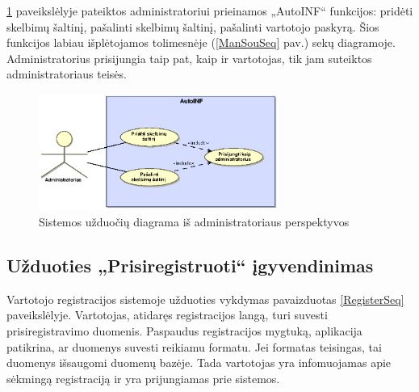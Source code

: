 \documentclass[12pt]{article}
\begin{document}
	\pagebreak	
	
	\ref{UseCaseAdmin} paveikslėlyje pateiktos administratoriui prieinamos „AutoINF“ funkcijos: pridėti skelbimų šaltinį, pašalinti skelbimų šaltinį, pašalinti vartotojo paskyrą. Šios funkcijos labiau išplėtojamos tolimesnėje (\ref{ManSouSeq} pav.) sekų diagramoje. Administratorius prisijungia taip pat, kaip ir vartotojas, tik jam suteiktos administratoriaus teisės.	
	
	\begin{figure}[h]
		\begin{center}
			\includegraphics[width=0.7\textwidth]{TikslaiAdministratorius.eps}
			\caption{Sistemos užduočių diagrama iš administratoriaus perspektyvos\label{UseCaseAdmin}}
		\end{center}
	\end{figure}	
	
	\pagebreak
	
	\subsection{Užduoties „Prisiregistruoti“ įgyvendinimas}
	
	Vartotojo registracijos sistemoje užduoties vykdymas pavaizduotas \ref{RegisterSeq} paveikslėlyje. Vartotojas, atidaręs registracijos langą, turi suvesti prisiregistravimo duomenis. Paspaudus registracijos mygtuką, aplikacija patikrina, ar duomenys suvesti reikiamu formatu. Jei formatas teisingas, tai duomenys išsaugomi duomenų bazėje. Tada vartotojas yra infomuojamas apie sėkmingą registraciją ir yra prijungiamas prie sistemos.	
	
\end{document}
